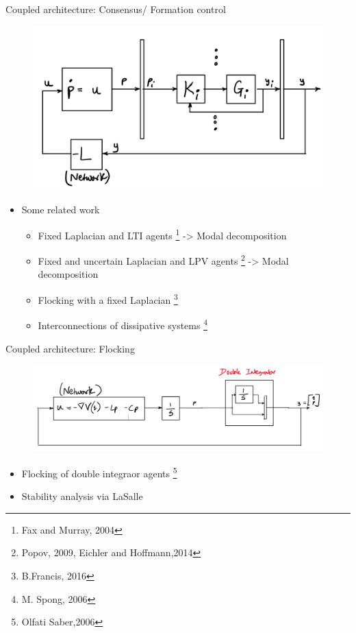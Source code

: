 \begin{frame}{Coupled architecture: Consensus/ Formation control}	
	\begin{figure}
		\includegraphics[scale=0.35]{figures/Coupled_consensus.jpg}	
		\label{fig:Coupled}
	\end{figure}
	\begin{itemize}
		\item Some related work
		\begin{itemize}
			\item Fixed Laplacian and LTI agents \footnote{Fax and Murray, 2004} -> Modal decomposition
			\item Fixed and uncertain Laplacian and LPV agents \footnote{Popov, 2009, Eichler and Hoffmann,2014} -> Modal decomposition 
			\item Flocking with a fixed Laplacian \footnote{B.Francis, 2016}	
			\item Interconnections of dissipative systems \footnote{M. Spong, 2006}		
		\end{itemize}
	\end{itemize}
\end{frame}
\begin{frame}{Coupled architecture: Flocking}	
	\begin{figure}
		\includegraphics[scale=0.35]{figures/Coupled_flocking_double_integrators.jpg}	
		\label{fig:Coupled}
	\end{figure}
	\begin{itemize}
		\item Flocking of double integraor agents \footnote{Olfati Saber,2006}
		\item Stability analysis via LaSalle
	\end{itemize}
\end{frame}
